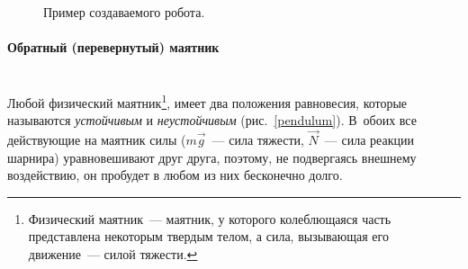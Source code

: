\documentclass[12pt,a4paper,openany]{extarticle}
\begin{document}
\begin{figure}[h]
	\noindent{}
	\caption{Пример создаваемого робота.}
	\label{robot}
\end{figure}

\paragraph*{Обратный (перевернутый) маятник}$\phantom{-}$\\
\hspace*{\parindent}Любой физический маятник\footnote{Физический маятник~--- маятник, у которого колеблющаяся часть представлена некоторым твердым телом, а сила, вызывающая его движение~--- силой тяжести.}\!\!, имеет два положения равновесия, которые называются \textit{устойчивым} и \textit{неустойчивым} (рис.~\ref{pendulum}).
В~обоих все действующие на маятник силы ($m\vec g$~--- сила тяжести, $\vec N$~--- сила реакции шарнира) уравновешивают друг друга, поэтому, не подвергаясь внешнему воздействию, он пробудет в любом из них бесконечно долго.
\end{document}
